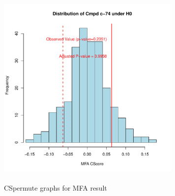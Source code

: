 \documentclass[a4paper]{article}\usepackage[]{graphicx}\usepackage[]{color}
\newenvironment{knitrout}{}{} %
\begin{document}
\begin{knitrout}
\begin{figure}[H]
\includegraphics[width=9cm,height=10cm]{figure/CSpermuteplots-3} \hfill{}

\caption[CSpermute graphs for MFA result]{CSpermute graphs for MFA result\label{fig:CSpermuteplots}}
\end{figure}


\end{knitrout}
\end{document}
